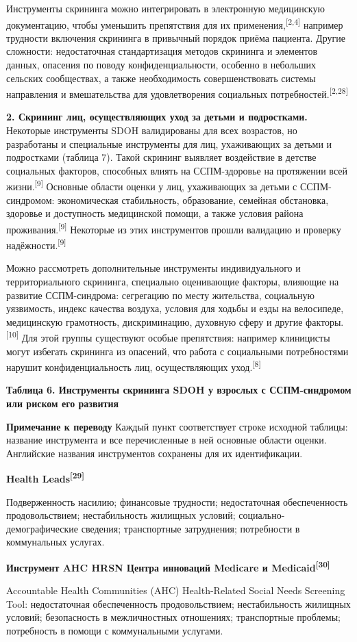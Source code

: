 \documentclass[11pt,a4paper]{article}
\newcommand{\src}[1]{\textsuperscript{[#1]}}
\newcommand{\editorial}[1]{\par\begingroup\small\color{black!70}\textbf{Примечание к переводу} #1\par\endgroup}
\newcommand{\heading}[1]{\par\medskip\textbf{#1}\par}
\begin{document}
Инструменты скрининга можно интегрировать в электронную медицинскую документацию, чтобы уменьшить препятствия для их применения,\src{2,4} например трудности включения скрининга в привычный порядок приёма пациента. Другие сложности: недостаточная стандартизация методов скрининга и элементов данных, опасения по поводу конфиденциальности, особенно в небольших сельских сообществах, а также необходимость совершенствовать системы направления и вмешательства для удовлетворения социальных потребностей.\src{2,28}

\textbf{2. Скрининг лиц, осуществляющих уход за детьми и подростками.} Некоторые инструменты SDOH валидированы для всех возрастов, но разработаны и специальные инструменты для лиц, ухаживающих за детьми и подростками (таблица 7). Такой скрининг выявляет воздействие в детстве социальных факторов, способных влиять на ССПМ-здоровье на протяжении всей жизни.\src{9} Основные области оценки у лиц, ухаживающих за детьми с ССПМ-синдромом: экономическая стабильность, образование, семейная обстановка, здоровье и доступность медицинской помощи, а также условия района проживания.\src{9} Некоторые из этих инструментов прошли валидацию и проверку надёжности.\src{9}

Можно рассмотреть дополнительные инструменты индивидуального и территориального скрининга, специально оценивающие факторы, влияющие на развитие ССПМ-синдрома: сегрегацию по месту жительства, социальную уязвимость, индекс качества воздуха, условия для ходьбы и езды на велосипеде, медицинскую грамотность, дискриминацию, духовную сферу и другие факторы.\src{10} Для этой группы существуют особые препятствия: например клиницисты могут избегать скрининга из опасений, что работа с социальными потребностями нарушит конфиденциальность лиц, осуществляющих уход.\src{8}

\heading{Таблица 6. Инструменты скрининга SDOH у взрослых с ССПМ-синдромом или риском его развития}
\editorial{Каждый пункт соответствует строке исходной таблицы: название инструмента и все перечисленные в ней основные области оценки. Английские названия инструментов сохранены для их идентификации.}
\heading{Health Leads\src{29}}
Подверженность насилию; финансовые трудности; недостаточная обеспеченность продовольствием; нестабильность жилищных условий; социально-демо\-графические сведения; транспортные затруднения; потребности в коммунальных услугах.

\heading{Инструмент AHC HRSN Центра инноваций Medicare и Medicaid\src{30}}
Accountable Health Communities (AHC) Health-Related Social Needs Screening Tool: недостаточная обеспеченность продовольствием; нестабильность жилищных условий; безопасность в межличностных отношениях; транспортные проблемы; потребность в помощи с коммунальными услугами.
\end{document}
